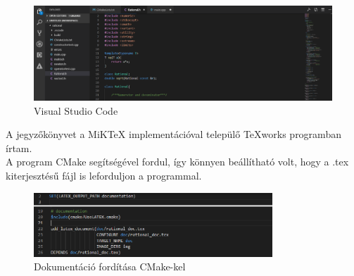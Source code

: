 \documentclass[a4paper, 12pt]{article}
\begin{document}
\begin{figure}[h!]
\includegraphics[width=1\textwidth]{vscode.eps}
\caption{ Visual Studio Code}
\end{figure}
\newpage
\noindent
A jegyzőkönyvet a MiKTeX implementációval települő TeXworks programban írtam.\\
A program CMake segítségével fordul, így könnyen beállítható volt, hogy a .tex kiterjesztésű fájl is leforduljon a programmal.
\begin{figure}[h!]
\centering
\includegraphics[width=0.8\textwidth]{cmake.eps}
\caption{Dokumentáció fordítása CMake-kel}
\end{figure}
\end{document}
